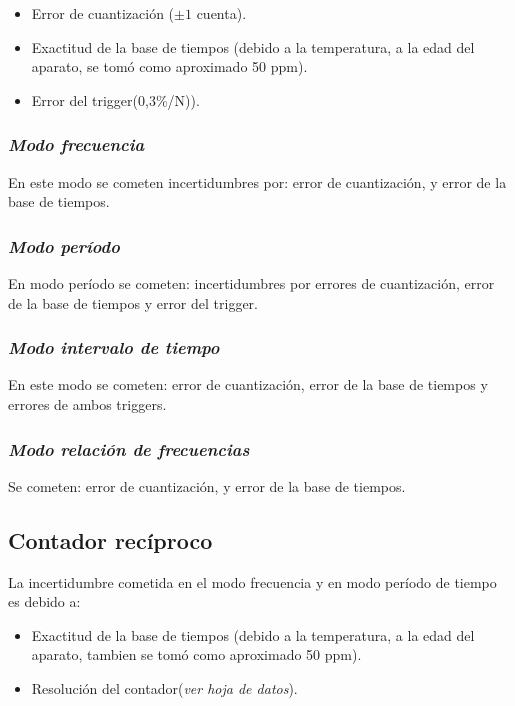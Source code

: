 \documentclass{article}
\begin{document}
\begin{itemize}
\item{Error de cuantización ($\pm 1$ cuenta).}
\item{Exactitud de la base de tiempos (debido a la temperatura, a la edad del aparato, se tomó como aproximado 50 ppm).}
\item{Error del trigger(0,3\%/N)).}
\end{itemize}

\medskip

\subsubsection{\textit{Modo frecuencia}}

En este modo se cometen incertidumbres por: error de cuantización, y error de la base de tiempos.
\medskip

\subsubsection{\textit{Modo período}}

En modo período se cometen: incertidumbres por errores de cuantización, error de la base de tiempos y error del trigger.
\medskip

\subsubsection{\textit{Modo intervalo de tiempo}}

En este modo se cometen: error de cuantización, error de la base de tiempos y errores de ambos triggers.
\medskip

\subsubsection{\textit{Modo relación de frecuencias}}

Se cometen: error de cuantización, y error de la base de tiempos.
\bigskip


\subsection{\textbf{Contador recíproco}}

La incertidumbre cometida en el modo frecuencia y en modo período de tiempo es debido a:\\

\begin{itemize}
\item{Exactitud de la base de tiempos (debido a la temperatura, a la edad del aparato, tambien se tomó como aproximado 50 ppm).}
\item{Resolución del contador(\textit{ver hoja de datos}).}
\end{itemize}

\bigskip


\newpage
\end{document}
